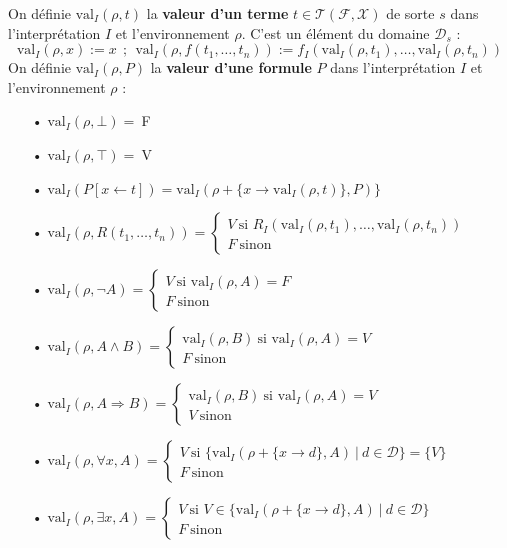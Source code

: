 \documentclass[11pt,a4paper]{article}
\begin{document}
On définie $\text{val}_I(\rho,t)$ la \textbf{valeur d'un terme} $t \in \mathcal{T}(\mathcal{F},\mathcal{X})$ de sorte $s$ dans l'interprétation $I$ et l'environnement $\rho$. C'est un élément du domaine $\mathcal{D}_s$ : \[\text{val}_I(\rho,x):=x \ \ ; \ \ \text{val}_I(\rho,f(t_1,\dots,t_n)):=f_I(\text{val}_I(\rho,t_1),\dots,\text{val}_I(\rho,t_n))\]
On définie $\text{val}_I(\rho,P)$ la \textbf{valeur d'une formule} $P$ dans l'interprétation $I$ et l'environnement $\rho$ :
\begin{itemize}
\item[•]$\text{val}_I(\rho,\bot) =\ $F
\item[•]$\text{val}_I(\rho,\top) =\ $V
\item[•]$\text{val}_I(P[x \leftarrow t]) = \text{val}_I(\rho+\{x \to \text{val}_I(\rho,t)\},P) \} $
\item[•]$\text{val}_I(\rho,R(t_1,\dots,t_n)) = \begin{cases} V \ \text{si } R_I(\text{val}_I(\rho,t_1),\dots,\text{val}_I(\rho,t_n)) \\ F \ \text{sinon} \end{cases} $
\item[•]$\text{val}_I(\rho,\lnot A) = \begin{cases} V \ \text{si } \text{val}_I(\rho,A) = F \\ F \ \text{sinon} \end{cases} $
\item[•]$\text{val}_I(\rho,A \land B) = \begin{cases} \text{val}_I(\rho,B) \ \text{si } \text{val}_I(\rho,A) = V \\ F \ \text{sinon} \end{cases} $
\item[•]$\text{val}_I(\rho,A \Rightarrow B) = \begin{cases} \text{val}_I(\rho,B) \ \text{si } \text{val}_I(\rho,A) = V \\ V \ \text{sinon} \end{cases} $
\item[•]$\text{val}_I(\rho,\forall x, A) = \begin{cases} V \ \text{si } \{\text{val}_I(\rho+\{x \to d\},A) \ | \ d \in \mathcal{D} \} = \{V\} \\ F \ \text{sinon} \end{cases} $
\item[•]$\text{val}_I(\rho,\exists x, A) = \begin{cases} V \ \text{si } V \in \{\text{val}_I(\rho+\{x \to d\},A) \ | \ d \in \mathcal{D} \} \\ F \ \text{sinon} \end{cases} $
\end{itemize} 
\end{document}
